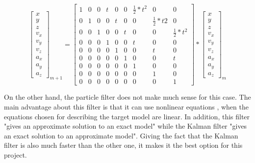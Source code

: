 \begin{equation}
\begin{bmatrix}
x \\ y \\ z \\ v_{x} \\ v_{y} \\ v_{z} \\ a_{x} \\ a_{y} \\ a_{z}
\end{bmatrix}_{m+1}
=
\begin{bmatrix}
1 & 0 & 0 & t & 0 & 0 & \frac{1}{2}*t^{2} & 0 & 0 \\
0 & 1 & 0 & 0 & t & 0 & 0 & \frac{1}{2}*t{2} & 0 \\
0 & 0 & 1 & 0 & 0 & t & 0 & 0 & \frac{1}{2}*t^{2}	\\
0 & 0 & 0 & 1 & 0 & 0 & t & 0 & 0 \\
0 & 0 & 0 & 0 & 1 & 0 & 0 & t & 0 \\
0 & 0 & 0 & 0 & 0 & 1 & 0 & 0 & t \\
0 & 0 & 0 & 0 & 0 & 0 & 1 & 0 & 0 \\
0 & 0 & 0 & 0 & 0 & 0 & 0 & 1 & 0 \\
0 & 0 & 0 & 0 & 0 & 0 & 0 & 0 & 1
\end{bmatrix}
*
\begin{bmatrix}
x \\ y \\ z \\ v_{x} \\ v_{y} \\ v_{z} \\ a_{x} \\ a_{y} \\ a_{z}
\end{bmatrix}_{m}
\label{eq:motion_mat}
\end{equation}

On the other hand, the particle filter does not make much sense for this case. The main advantage about this filter is that it can use nonlinear equations \cite{kalman_lectures}, when the equations chosen for describing the target model are linear. In addition, this filter "gives an approximate solution to an exact model" while the Kalman filter "gives an exact solution to an approximate model". Giving the fact that the Kalman filter is also much faster than the other one, it makes it the best option for this project.\\

